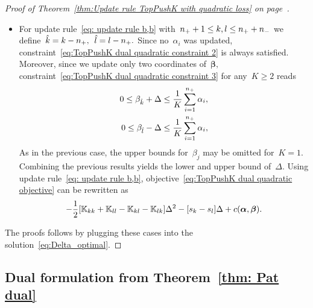 \begin{proof}[Proof of Theorem~\ref{thm:Update rule TopPushK with quadratic loss} on page~\pageref{thm:Update rule TopPushK with quadratic loss}]
\begin{itemize}
    \item For update rule~\eqref{eq: update rule b,b} with~$n_{+} + 1\le k,l \le n_{+} + n_{-}$ we define~$\hat{k} = k - n_{+},$~$\hat{l} = l - n_{+}.$ Since no~$\alpha_i$ was updated, constraint~\eqref{eq:TopPushK dual quadratic constraint 2} is always satisfied. Moreover, since we update only two coordinates of~$\bm{\beta},$ constraint~\eqref{eq:TopPushK dual quadratic constraint 3} for any~$K \geq 2$ reads
    \begin{equation}\label{eq: TopPushK dual quadratic b,b - bounds}
      \begin{aligned}
        0 \leq \beta_{\hat{k}} + \Delta \leq \frac{1}{K} \sum_{i = 1}^{n_{+}} \alpha_i, \\
        0 \leq \beta_{\hat{l}} - \Delta \leq \frac{1}{K} \sum_{i = 1}^{n_{+}} \alpha_i,
      \end{aligned}
    \end{equation}
    As in the previous case, the upper bounds for~$\beta_j$ may be omitted for~$K = 1$. Combining the previous results yields the lower and upper bound of~$\Delta.$ Using update rule~\eqref{eq: update rule b,b}, objective~\eqref{eq:TopPushK dual quadratic objective} can be rewritten as
    \begin{equation*}
      - \frac{1}{2} \Brac[s]{\K_{kk} + \K_{ll} - \K_{kl} - \K_{lk}} \Delta^2 - \Brac[s]{s_k - s_l} \Delta + c(\bm{\alpha}, \bm{\beta}).
    \end{equation*}
  \end{itemize}
  The proofs follows by plugging these cases into the solution~\eqref{eq:Delta_optimal}.
\end{proof}

\subsection*{Dual formulation from Theorem~\ref{thm: Pat dual}}

